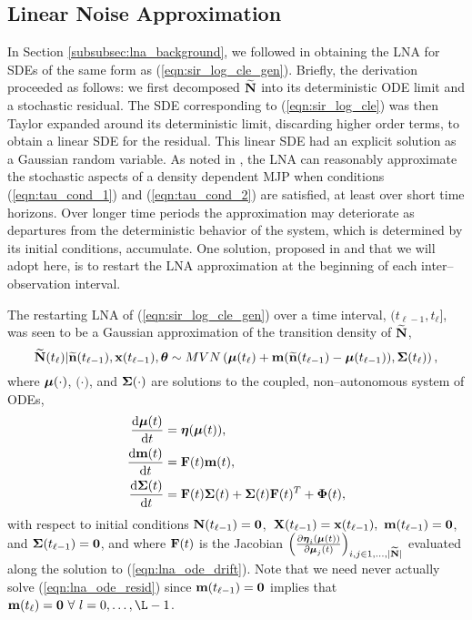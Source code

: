 \subsection{Linear Noise Approximation}
\label{subsec:sir_lna}

In Section \ref{subsubsec:lna_background}, we followed \cite{fearnhead2014,golightly2013simulation,golightly2015delayed} in obtaining the LNA for SDEs of the same form as (\ref{eqn:sir_log_cle_gen}). Briefly, the derivation proceeded as follows: we first decomposed $ \widetilde{\mathbf{N}} $ into its deterministic ODE limit and a stochastic residual. The SDE corresponding to (\ref{eqn:sir_log_cle}) was then Taylor expanded around its deterministic limit, discarding higher order terms, to obtain a linear SDE for the residual. This linear SDE had an explicit solution as a Gaussian random variable. As noted in \cite{wallace2012linear}, the LNA can reasonably approximate the stochastic aspects of a density dependent MJP when conditions (\ref{eqn:tau_cond_1}) and (\ref{eqn:tau_cond_2}) are satisfied, at least over short time horizons. Over longer time periods the approximation may deteriorate as departures from the deterministic behavior of the system, which is determined by its initial conditions, accumulate.  One solution, proposed in \cite{fearnhead2014} and that we will adopt here, is to restart the LNA approximation at the beginning of each inter--observation interval. 

The restarting LNA of (\ref{eqn:sir_log_cle_gen}) over a time interval, $ (t_{\ell-1},t_\ell] $, was seen to be a Gaussian approximation of the transition density of $ \widetilde{\mathbf{N}} $,
\begin{equation}
\label{eqn:lna_transition_density}
\widetilde{\mathbf{N}}(t_\ell)|\widetilde{\mathbf{n}}(t_{\ell-1}), \mathbf{x}(t_{\ell-1}),\boldsymbol{\theta} \sim MVN\left (\boldsymbol{\mu}(t_\ell) + \mathbf{m}(\widetilde{\mathbf{n}}(t_{\ell-1}) - \boldsymbol{\mu}(t_{\ell-1})), \boldsymbol{\Sigma}(t_\ell)\right ),
\end{equation}
where $ \boldsymbol{\mu}(\cdot) $, $ \bm(\cdot) $, and $ \boldsymbol{\Sigma}(\cdot) $ are solutions to the coupled, non--autonomous system of ODEs,
\begin{align}
\label{eqn:lna_ode_drift}
\frac{\mathrm{d}\boldsymbol{\mu}(t)}{\mathrm{d} t} &= \boldsymbol{\eta}(\boldsymbol{\mu}(t)),\\
\label{eqn:lna_ode_resid}
\frac{\mathrm{d}\mathbf{m}(t)}{\mathrm{d} t} &= \mathbf{F}(t)\mathbf{m}(t),\\
\label{eqn:lna_ode_diffusion}
\frac{\mathrm{d}\boldsymbol{\Sigma}(t)}{\mathrm{d} t} &= \mathbf{F}(t)\boldsymbol{\Sigma}(t) + \boldsymbol{\Sigma}(t)\mathbf{F}(t)^T + \boldsymbol{\Phi}(t),
\end{align}
with respect to initial conditions $ \mathbf{N}(t_{\ell-1}) = \boldsymbol{0} $,\ $ \mathbf{X}(t_{\ell-1}) = \mathbf{x}(t_{\ell-1}),\ \mathbf{m}(t_{\ell-1}) = \boldsymbol{0}$, and $ \boldsymbol{\Sigma}(t_{\ell-1}) = \boldsymbol{0} $, and where $ \mathbf{F}(t) $ is the Jacobian $ \left (\frac{\partial\boldsymbol{\eta}_i(\boldsymbol{\mu}(t))}{\partial\boldsymbol{\mu}_j(t)}\right )_{i,j\in{1,\dots,|\widetilde{\mathbf{N}}|}} $ evaluated along the solution to (\ref{eqn:lna_ode_drift}). Note that we need never actually solve (\ref{eqn:lna_ode_resid}) since $ \mathbf{m}(t_{\ell-1}) = \boldsymbol{0} $ implies that $ \bm(t_\ell) = \bs{0}\ \forall\ l=0,\dots,\L-1$. 

